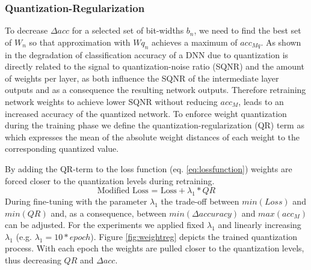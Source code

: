 \subsubsection{Quantization-Regularization}
\label{subsec:qr}
To decrease $\Delta acc$ for a selected set of bit-widths $b_n$, we need to find the best set of $W_n$ so that approximation with $Wq_n$ achieves a maximum of $acc_{Mq}$. As shown in \cite{Lin2015a, Shin2017} the degradation of classification accuracy of a DNN due to quantization is directly related to the signal to quantization-noise ratio (SQNR) and the amount of weights per layer, as both influence the SQNR of the intermediate layer outputs and as a consequence the resulting network outputs. Therefore retraining network weights to achieve lower SQNR without reducing $acc_{M}$, leads to an increased accuracy of the quantized network.
To enforce weight quantization during the training phase we define the quantization-regularization (QR) term as
which expresses the mean of the absolute weight distances of each weight to the corresponding quantized value.

By adding the QR-term to the loss function (eq. \ref{eq:lossfunction}) weights are forced closer to the quantization levels during retraining.
\begin{equation}\label{eq:lossfunction}
\textrm{Modified Loss = Loss}+\lambda_1*QR
\end{equation}
During fine-tuning with the parameter $\lambda_1$ the trade-off between $min(Loss)$ and $min(QR)$ and, as a consequence, between $min(\Delta accuracy)$ and $max(acc_{M})$ can be adjusted. For the experiments we applied fixed $\lambda_1$ and linearly increasing $\lambda_1$ (e.g. $\lambda_1=10*epoch$). Figure \ref{fig:weightreg} depicts the trained quantization process. With each epoch the weights are pulled closer to the quantization levels, thus decreasing $QR$ and $\Delta acc$.


